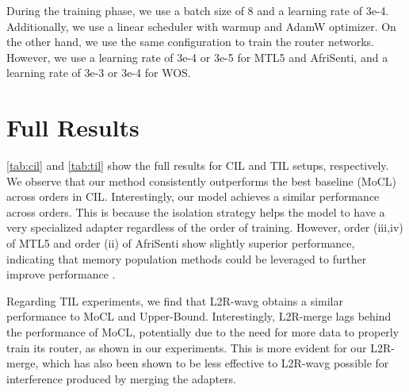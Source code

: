 \documentclass[11pt]{article}
\begin{document}
During the training phase, we use a batch size of 8 and a learning rate of 3e-4. Additionally, we use a linear scheduler with warmup and AdamW optimizer.
On the other hand, we use the same configuration to train the router networks. However, we use a learning rate of 3e-4 or 3e-5 for MTL5 and AfriSenti, and a learning rate of 3e-3 or 3e-4 for WOS.

\section{Full Results}
\label{sec:appendix:results}
\autoref{tab:cil} and \autoref{tab:til} show the full results for CIL and TIL setups, respectively.
We observe that our method consistently outperforms the best baseline (MoCL) across orders in CIL. Interestingly, our model achieves a similar performance across orders. This is because the isolation strategy helps the model to have a very specialized adapter regardless of the order of training.
However, order (iii,iv) of MTL5 and order (ii) of AfriSenti show slightly superior performance, indicating that memory population methods could be leveraged to further improve performance \cite{araujo-etal-2022-relevant}.

Regarding TIL experiments, we find that L2R-wavg obtains a similar performance to MoCL and Upper-Bound. Interestingly, L2R-merge lags behind the performance of MoCL, potentially due to the need for more data to properly train its router, as shown in our experiments. This is more evident for our L2R-merge, which has also been shown to be less effective to L2R-wavg possible for interference produced by merging the adapters.
\end{document}
